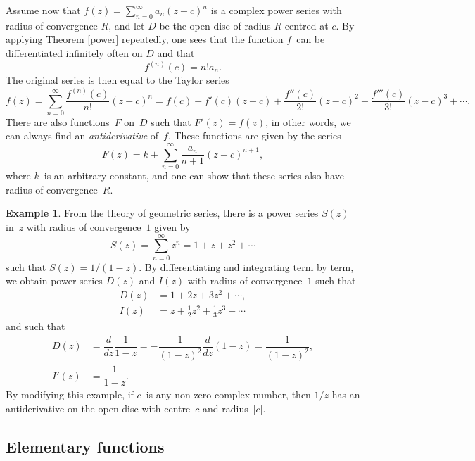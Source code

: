 \documentclass{amsproc}
\theoremstyle{definition}
\newtheorem{example}[theorem]{Example}
\theoremstyle{remark}
\numberwithin{equation}{section}
\begin{document}
Assume now that $ f(z) = \sum_{n = 0}^\infty a_n(z - c)^n $ is a complex power series with radius of convergence $ R $, and let $ D $ be the open disc of radius $ R $ centred at $ c $.
By applying Theorem \ref{power} repeatedly, one sees that the function $ f $~can be differentiated infinitely often on $ D $ and that
$$
f^{(n)}(c) = n! a_n.
$$
The original series is then equal to the Taylor series
$$
f(z) = \sum_{n = 0}^\infty \dfrac{f^{(n)}(c)}{n!}(z - c)^n = f(c) + f'(c)(z - c) + \dfrac{f''(c)}{2!}(z - c)^2 + \dfrac{f'''(c)}{3!}(z - c)^3 + \cdots.
$$
There are also functions~$ F $ on~$ D $ such that $ F'(z) = f(z) $, in other words, we can always find an \emph{antiderivative} of~$ f $. These functions are given by the series
$$
F(z) = k + \sum_{n=0}^\infty\dfrac{a_n}{n+1}(z-c)^{n+1},
$$
where $ k $~is an arbitrary constant, and one can show that these series also have radius of convergence~$ R $.

\begin{example} \label{CME2.1}
From the theory of geometric series, there is a power series $ S(z) $ in~$ z $ with radius of convergence~$ 1 $ given by
$$
S(z) = \sum_{n=0}^\infty z^n = 1 + z + z^2 + \cdots
$$
such that $ S(z) = 1/(1 - z) $. By differentiating and integrating term by term, we obtain power series $ D(z) $ and $ I(z) $ with radius of convergence~$ 1 $ such that
\begin{align*}
D(z) &= 1 + 2z + 3z^2 + \cdots, \\
I(z) &= z + \tfrac{1}{2}z^2 + \tfrac{1}{3}z^3 + \cdots
\end{align*}
and such that
\begin{align*}
D(z) &= \dfrac{d}{dz} \dfrac{1}{1 - z} = - \dfrac{1}{(1 - z)^2} \dfrac{d}{dz}(1 - z) = \dfrac{1}{(1 - z)^2}, \\
I'(z) &= \dfrac{1}{1 - z}.
\end{align*}
By modifying this example, if $ c $~is any non-zero complex number, then $ 1/z $ has an antiderivative on the open disc with centre~$ c $ and radius~$ |c| $.
\end{example}


\vfill\pagebreak



\subsection{Elementary functions} \label{CMS3}
\end{document}
